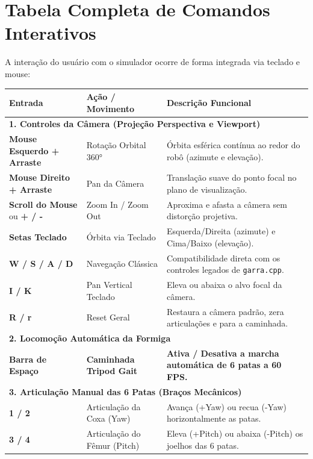 \documentclass[11pt,a4paper]{article}
\begin{document}
\section{Tabela Completa de Comandos Interativos}

A interação do usuário com o simulador ocorre de forma integrada via teclado e mouse:

\begin{table}[h!]
\centering
\small
\begin{tabularx}{\textwidth}{l p{4.8cm} X}
\toprule
\textbf{Entrada} & \textbf{Ação / Movimento} & \textbf{Descrição Funcional} \\
\midrule
\multicolumn{3}{l}{\textbf{\textcolor{primary}{1. Controles da Câmera (Projeção Perspectiva e Viewport)}}} \\
\midrule
\textbf{Mouse Esquerdo + Arraste} & Rotação Orbital 360° & Órbita esférica contínua ao redor do robô (azimute e elevação). \\
\textbf{Mouse Direito + Arraste} & Pan da Câmera & Translação suave do ponto focal no plano de visualização. \\
\textbf{Scroll do Mouse} ou \textbf{+ / -} & Zoom In / Zoom Out & Aproxima e afasta a câmera sem distorção projetiva. \\
\textbf{Setas Teclado} & Órbita via Teclado & Esquerda/Direita (azimute) e Cima/Baixo (elevação). \\
\textbf{W / S / A / D} & Navegação Clássica & Compatibilidade direta com os controles legados de \texttt{garra.cpp}. \\
\textbf{I / K} & Pan Vertical Teclado & Eleva ou abaixa o alvo focal da câmera. \\
\textbf{R / r} & Reset Geral & Restaura a câmera padrão, zera articulações e para a caminhada. \\
\midrule
\multicolumn{3}{l}{\textbf{\textcolor{primary}{2. Locomoção Automática da Formiga}}} \\
\midrule
\textbf{Barra de Espaço} & \textbf{Caminhada Tripod Gait} & \textbf{Ativa / Desativa a marcha automática de 6 patas a 60 FPS.} \\
\midrule
\multicolumn{3}{l}{\textbf{\textcolor{primary}{3. Articulação Manual das 6 Patas (Braços Mecânicos)}}} \\
\midrule
\textbf{1 / 2} & Articulação da Coxa (Yaw) & Avança (+Yaw) ou recua (-Yaw) horizontalmente as patas. \\
\textbf{3 / 4} & Articulação do Fêmur (Pitch) & Eleva (+Pitch) ou abaixa (-Pitch) os joelhos das 6 patas. \\

\end{tabularx}
\end{table}
\end{document}
